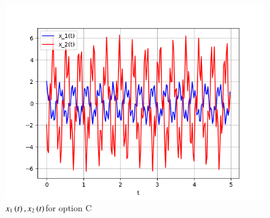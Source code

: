 \documentclass[journal,12pt,twocolumn]{IEEEtran}
\theoremstyle{remark}
\begin{document}
\begin{figure}[h!]
    \includegraphics[width = \columnwidth]{figs/Figure_2.png}
    \caption{$ x_1\left(t\right), x_2\left(t\right)$for option C}
    \centering
    \label{fig: 2021ae_32_fig_2}
\end{figure}
\end{document}
